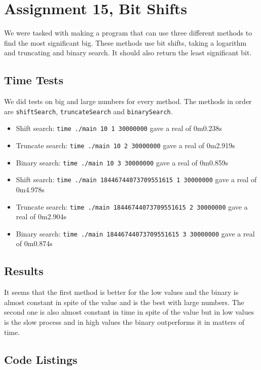 \documentclass[a4paper]{article}
\begin{document}
\section*{Assignment 15, Bit Shifts}
We were tasked with making a program that can use three different methods to find the most significant big.
These methods use bit shifts, taking a logarithm and truncating and binary search.
It should also return the least significant bit.

\subsection*{Time Tests}
We did tests on big and large numbers for every method.
The methods in order are \texttt{shiftSearch}, \texttt{truncateSearch} and \texttt{binarySearch}.

\begin{itemize}
\item Shift search: \texttt{time ./main 10 1 30000000} gave a real of 0m0.238s
\item Truncate search: \texttt{time ./main 10 2 30000000} gave a real of 0m2.919s
\item Binary search: \texttt{time ./main 10 3 30000000} gave a real of 0m0.859s
\end{itemize}

\begin{itemize}
\item Shift search: \texttt{time ./main 18446744073709551615 1 30000000} gave a real of 0m4.978s
\item Truncate search: \texttt{time ./main 18446744073709551615 2 30000000} gave a real of 0m2.904s
\item Binary search: \texttt{time ./main 18446744073709551615 3 30000000} gave a real of 0m0.874s
\end{itemize}

\subsection*{Results}
It seems that the first method is better for the low values and the binary is almost constant in spite of the value and is the best with large numbers. The second one is also almost constant in time in spite of the value but in low values is the slow process and in high values the binary outperforms it in matters of time.

\subsection*{Code Listings}






\end{document}
